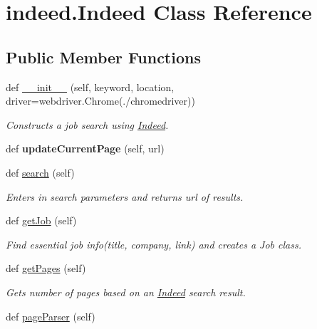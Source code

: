 \hypertarget{classindeed_1_1Indeed}{}\section{indeed.\+Indeed Class Reference}
\label{classindeed_1_1Indeed}
\subsection*{Public Member Functions}
\begin{DoxyCompactItemize}
\item 
def \hyperlink{classindeed_1_1Indeed_a4bb7053b7c47c08884cf423ac5c27266}{\+\_\+\+\_\+init\+\_\+\+\_\+} (self, keyword, location, driver=webdriver.\+Chrome(\textquotesingle{}./chromedriver\textquotesingle{}))
\begin{DoxyCompactList}\small\item\em Constructs a job search using \hyperlink{classindeed_1_1Indeed}{Indeed}. \end{DoxyCompactList}\item 
\mbox{\label{classindeed_1_1Indeed_ae8ebb740057615b8ecd77b9bd9378837}} 
def {\bfseries update\+Current\+Page} (self, url)
\item 
def \hyperlink{classindeed_1_1Indeed_a21ada3714f73ea0dc98c2ff0099ee286}{search} (self)
\begin{DoxyCompactList}\small\item\em Enters in search parameters and returns url of results. \end{DoxyCompactList}\item 
def \hyperlink{classindeed_1_1Indeed_a52d569fcd959a29e5a75a6f5fa2a9e4c}{get\+Job} (self)
\begin{DoxyCompactList}\small\item\em Find essential job info(title, company, link) and creates a Job class. \end{DoxyCompactList}\item 
def \hyperlink{classindeed_1_1Indeed_a8eb93c40c02d65313a51de249ef377d0}{get\+Pages} (self)
\begin{DoxyCompactList}\small\item\em Gets number of pages based on an \hyperlink{classindeed_1_1Indeed}{Indeed} search result. \end{DoxyCompactList}\item 
def \hyperlink{classindeed_1_1Indeed_ae460f5026455d12e9b50ceabc1a373dc}{page\+Parser} (self)

\end{DoxyCompactItemize}

